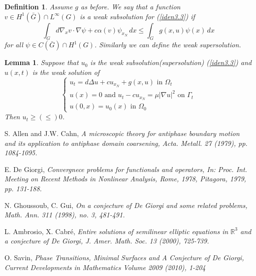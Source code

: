 \documentclass[12pt, a4paper]{article}
\newtheorem{lemma}[thm]{Lemma}
\newtheorem{defn}[thm]{Definition}
\numberwithin{equation}{section}
\newcommand{\R}{\mathbb{R}}
\begin{document}
\begin{CJK}{UTF8}{bkai}
\begin{defn}
	Assume $g$ as before. We say that a function $v\in H^1(\bar{G})\cap L^\infty(G)$ is a weak subsolution for (\ref{iden3.3}) if
\begin{equation}
	\int_Gd\nabla_xv\cdot\nabla\psi+c\alpha(v)\psi_{x_N}\,dx\leq \int_Gg(x,u)\psi(x)\,dx
\end{equation}
for all $\psi\in C(\bar{G})\cap H^1(G)$. Similarly we can define the weak supersolution.
\end{defn}

\begin{lemma} 
Suppose that $u_0$ is the weak subsolution(supersolution) (\ref{iden3.3}) and $u(x,t)$ is the weak solution of
\[
\begin{cases}
	u_t=d\Delta u+cu_{x_N}+g(x,u)\mbox{ in }\Omega_t\\
	u(x)=0\mbox{ and } 	u_t-cu_{x_N}=\mu|\nabla u|^2\mbox{ on }\Gamma_t\\
	u(0,x)=u_0(x) \mbox{ in } \Omega_0
\end{cases}
\]
Then $u_t\geq(\leq) 0$.
\end{lemma}


\clearpage












\begin{thebibliography}{99}
	
	 S. Allen and J.W. Cahn, {\it A microscopic theory for antiphase boundary motion and its
application to antiphase domain coarsening, Acta. Metall. 27 (1979), pp. 1084-1095.}

	 E. De Giorgi, {\it Convergnece problems for functionals and operators, In: Proc. Int. Meeting
on Recent Methods in Nonlinear Analysis, Rome, 1978, Pitagora, 1979, pp. 131-188.}

	 N. Ghoussoub, C. Gui, {\it On a conjecture of De Giorgi and some related problems, Math. Ann. 311 (1998), no. 3, 481-491.}

	 L. Ambrosio, X. Cabr\'e, {\it Entire solutions of semilinear elliptic equations in $\R^3$ and a conjecture of De Giorgi, J. Amer. Math. Soc. 13 (2000), 725-739.}

	 O. Savin, {\it Phase Transitions, Minimal Surfaces and A Conjecture of De Giorgi, Current Developments in Mathematics
Volume 2009 (2010), 1-204}


\end{thebibliography}
\end{CJK}
\end{document}
